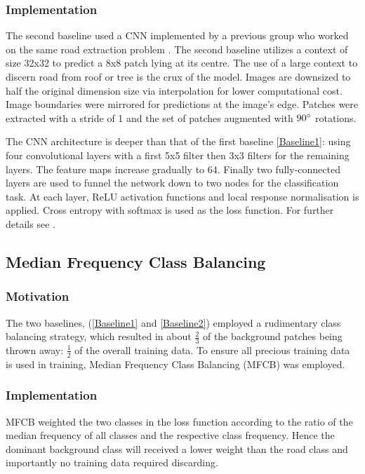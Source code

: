 \documentclass[10pt,conference,compsocconf]{IEEEtran}
\begin{document}
\subsubsection{Implementation}
The second baseline used a CNN implemented by a previous group who worked on the same road extraction problem \cite{mato}. The second baseline utilizes a context of size 32x32 to predict a 8x8 patch lying at its centre. The use of a large context to discern road from roof or tree is the crux of the model. Images are downsized to half the original dimension size via interpolation for lower computational cost. Image boundaries were mirrored for predictions at the image's edge. Patches were extracted with a stride of 1 and the set of patches augmented with $90 \degree$ rotations.

The CNN architecture is deeper than that of the first baseline \ref{Baseline1}: using four convolutional layers with a first 5x5 filter then 3x3 filters for the remaining layers. The feature maps increase gradually to 64. Finally two fully-connected layers are used to funnel the network down to two nodes for the classification task. At each layer, ReLU activation functions and local response normalisation \cite{Krizhevsky2012} is applied. Cross entropy with softmax is used as the loss function. For further details see \cite{mato}.

\subsection{Median Frequency Class Balancing}
\label{classbalancing}
\subsubsection{Motivation}
The two baselines, (\ref{Baseline1} and \ref{Baseline2}) employed a rudimentary class balancing strategy, which resulted in about $\frac{2}{3}$ of the background patches being thrown away: $\frac{1}{2}$ of the overall training data. To ensure all precious training data is used in training, Median Frequency Class Balancing (MFCB) \cite{Eigen2016} \cite{DBLP:journals/corr/BadrinarayananK15} was employed. 
\subsubsection{Implementation}
MFCB weighted the two classes in the loss function according to the ratio of the median frequency of all classes and the respective class frequency. Hence the dominant background class will received a lower weight than the road class and importantly no training data required discarding.
\end{document}
